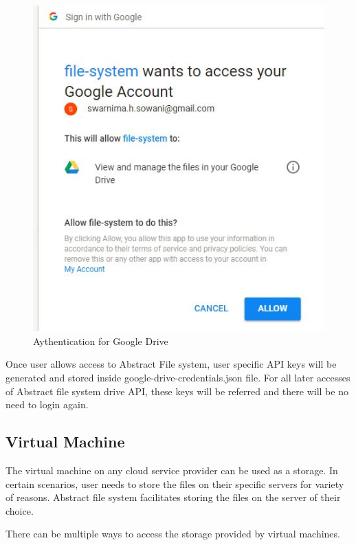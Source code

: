 \begin{figure}[!ht]
        \centering\includegraphics[width=\columnwidth]
        {image/auth.JPG}
        \caption{Aythentication for Google Drive}\label{fig:auth}
\end{figure}


Once user allows access to Abstract File system, user specific API keys will 
be generated and stored inside google-drive-credentials.json file. 
For all later accesses of Abstract file system drive API, these keys will be 
referred and there will be no need to login again. 


\subsection{Virtual Machine}

The virtual machine on any cloud service provider can be used as a storage. In 
certain scenarios, user needs to store the files on their specific servers for 
variety of reasons. Abstract file system facilitates storing the files on the 
server of their choice.

There can be multiple ways to access the storage provided by virtual machines. 

